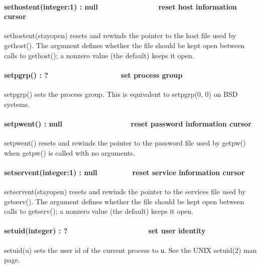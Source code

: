 \paragraph[sethostent(integer:1) : null\ \ \ \ \ \ \ \ 
\ \ \ \ \ \ \ reset host information cursor]{sethostent(integer:1) :
null\ \ \ \ \ \ \ \  \ \ \ \ \ \ \ reset host information cursor}
sethostent(stayopen) resets and rewinds the pointer to the host file
used by gethost(). The argument defines whether the file should be kept
open between calls to gethost(); a nonzero value (the default) keeps it
open. 

\paragraph[setpgrp() : ?\ \ \ \ \ \ \ \ \ \ \ \ \ \ \ \  \ \ set process
group]{setpgrp() : ?\ \ \ \ \ \ \ \ \ \ \ \ \ \ \ \  \ \ set process
group}
setpgrp() sets the process group. This is equivalent to setpgrp(0, 0) on
BSD systems. 

\paragraph[setpwent() : null\ \ \ \ \ \ \ \  \ \ \ \ \ \ \ \ \ reset
password information cursor]{setpwent() : null\ \ \ \ \ \ \ \ 
\ \ \ \ \ \ \ \ \ reset password information cursor}
setpwent() resets and rewinds the pointer to the password file used by
getpw() when getpw() is called with no arguments.

\paragraph[setservent(integer:1) : null \ \ \ \ \ \  \ \ reset service
information cursor]{setservent(integer:1) : null \ \ \ \ \ \  \ \ reset
service information cursor}
setservent(stayopen) resets and rewinds the pointer to the services file
used by getserv(). The argument defines whether the file should be kept
open between calls to getserv(); a nonzero value (the default) keeps it
open. 

\paragraph[setuid(integer) : ?\ \ \ \ \ \ \ \ \ \ \ \ \ \ 
\ \ \ \ \ \ set user identity]{setuid(integer) :
?\ \ \ \ \ \ \ \ \ \ \ \ \ \  \ \ \ \ \ \ set user identity}
setuid(u) sets the user id of the current process to \texttt{u}. See the
UNIX setuid(2) man page. 

